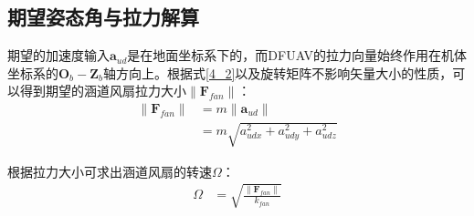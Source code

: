 \subsection{期望姿态角与拉力解算}

期望的加速度输入$\boldsymbol{a}_{ud}$是在地面坐标系下的，而DFUAV的拉力向量始终作用在机体坐标系的$\boldsymbol{O}_b-\boldsymbol{Z}_b$轴方向上。根据式\eqref{4_2}以及旋转矩阵不影响矢量大小的性质，可以得到期望的涵道风扇拉力大小$\|\boldsymbol{F}_{fan}\|$：
\begin{equation}
    \begin{aligned}
        \|\boldsymbol{F}_{fan}\|&=m\|\boldsymbol{a}_{ud}\|\\
        &=m\sqrt{a_{udx}^2+a_{udy}^2+a_{udz}^2}
    \end{aligned}
    \label{4_23}
\end{equation}

根据拉力大小可求出涵道风扇的转速$\Omega$：
\begin{equation}
    \begin{aligned}
        \Omega&=\sqrt{\frac{\|\boldsymbol{F}_{fan}\|}{k_{fan}}}
    \end{aligned}
    \label{4_24}
\end{equation}





